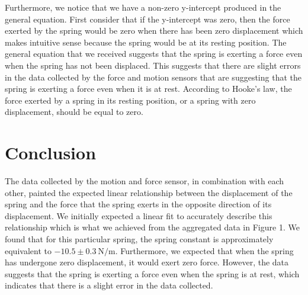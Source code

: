 \documentclass[12pt]{article}
\begin{document}
Furthermore, we notice that we have a non-zero y-intercept produced in the general equation. First consider that if the y-intercept was zero, then the force exerted by the spring would be zero when there has been zero displacement which makes intuitive sense because the spring would be at its resting position. The general equation that we received suggests that the spring is exerting a force even when the spring has not been displaced. This suggests that there are slight errors in the data collected by the force and motion sensors that are suggesting that the spring is exerting a force even when it is at rest. According to Hooke's law, the force exerted by a spring in its resting position, or a spring with zero displacement, should be equal to zero.

\section{Conclusion}
The data collected by the motion and force sensor, in combination with each other, painted the expected linear relationship between the displacement of the spring and the force that the spring exerts in the opposite direction of its displacement. We initially expected a linear fit to accurately describe this relationship which is what we achieved from the aggregated data in Figure 1. We found that for this particular spring, the spring constant is approximately equivalent to $-10.5 \pm \SI{0.3}{\newton\per\metre}$. Furthermore, we expected that when the spring has undergone zero displacement, it would exert zero force. However, the data suggests that the spring is exerting a force even when the spring is at rest, which indicates that there is a slight error in the data collected.
\end{document}
